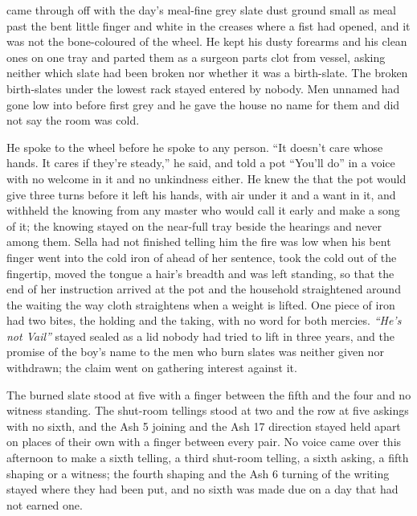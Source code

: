  came through  off  with the day’s meal-fine grey slate dust ground small as meal past the bent little finger and white in the creases where a fist had opened, and it was not the bone-coloured  of the wheel. He kept his dusty forearms and his clean ones on one tray and parted them as a surgeon parts clot from vessel, asking neither which slate had been broken nor whether it was a birth-slate. The broken birth-slates under the lowest rack stayed entered by nobody. Men unnamed had gone low into  before first grey and he gave the house no name for them and did not say the room was cold.

He spoke to the wheel before he spoke to any person. “It doesn’t care whose hands. It cares if they’re steady,” he said, and told a pot “You’ll do” in a voice with no welcome in it and no unkindness either. He knew the  that the pot would give three turns before it left his hands, with air under it and a want in it, and withheld the knowing from any  master who would call it early and make a song of it; the knowing stayed on the near-full tray beside the hearings and never among them. Sella had not finished telling him the fire was low when his bent finger went into the cold iron of  ahead of her sentence, took the cold out of the fingertip, moved the tongue a hair’s breadth and was left standing, so that the end of her instruction arrived at the pot and the household straightened around the waiting the way cloth straightens when a weight is lifted. One piece of iron had two bites, the holding and the taking, with no  word for both mercies. \emph{“He’s not Vail”} stayed sealed as a lid nobody had tried to lift in three years, and the promise of the boy’s name to the men who burn slates was neither given nor withdrawn; the claim went on gathering interest against it.

The burned slate stood at five with a finger between the fifth and the four and no witness standing. The shut-room tellings stood at two and the row at five askings with no sixth, and the Ash 5 joining and the Ash 17 direction stayed held apart on places of their own with a finger between every pair. No voice came over  this afternoon to make a sixth telling, a third shut-room telling, a sixth asking, a fifth shaping or a witness; the fourth shaping and the Ash 6 turning of the writing stayed where they had been put, and no sixth was made due on a day that had not earned one.

